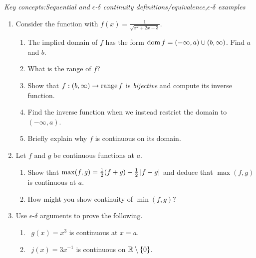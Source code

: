 \begin{exercises}{}{}
	\emph{Key concepts:\quad Sequential and $\epsilon$-$\delta$ continuity definitions/equivalence,\quad $\epsilon$-$\delta$ examples}

	\begin{enumerate}
	  \item Consider the function with $f(x)=\frac 1{\sqrt{x^2+2x-3}}$.\vspace{-2pt}
	  \begin{enumerate}
	    \item The implied domain of $f$ has the form $\operatorname{dom} f=(-\infty,a)\cup (b,\infty)$. Find $a$ and $b$.
	    \item What is the range of $f$?
	    \item Show that $f:(b,\infty)\to\operatorname{range} f$ is \emph{bijective} and compute its inverse function.
	    \item Find the inverse function when we instead restrict the domain to $(-\infty,a)$.
	    \item Briefly explain why $f$ is continuous on its domain.
	  \end{enumerate}
	  
	  
	  \item %
	  \label{exs:maxcont}
	  Let $f$ and $g$ be continuous functions at $a$.
	  \begin{enumerate}
	    \item Show that $\max(f,g)=\frac 12(f+g)+\frac 12\left| f-g\right|$ and deduce that $\max(f,g)$ is continuous at $a$. 
	  	\item How might you show continuity of $\min(f,g)$?
	  \end{enumerate}
	  
	
	  
	
	  
	  \item Use $\epsilon$-$\delta$ arguments to prove the following.
	  \begin{enumerate}
	  	\item {} \ 
	  	$g(x)=x^3$ is continuous at $x=a$.
	  	\setcounter{enumii}{2}
	  	\item \makebox[230pt][l]{$h:[0,\infty)\to\R:x\mapsto\sqrt x$ is continuous.\hfill (d)} \
	  	$j(x)=3x^{-1}$ is continuous on $\mathbb{R}\setminus\{0\}$.
	  \end{enumerate}
		

\end{enumerate}
\end{exercises}
